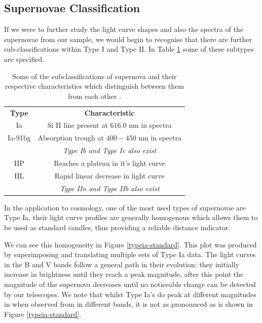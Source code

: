 \documentclass[twocolumn]{revtex4}
\newcommand{\squeezeup}{\vspace{-2.5mm}}
\begin{document}
\vspace{-3ex}
\subsection{Supernovae Classification}
\vspace{-2ex}

If we were to further study the light curve shapes and also the spectra of the supernovae from our sample, we would begin to recognise that there are further sub-classifications within Type I and Type II. In Table \ref{sn_classes} some of these subtypes are specified.

\begin{table}[h!]
\centering
\begin{tabular}{c@{\hskip 20pt}c} 
 \hline
 \textbf{Type} & \textbf{Characteristic} \\ 
 Ia		& Si II line present at $616.0$ nm in spectra \\
 Ia-91bg	& Absorption trough at $400-450$ nm in spectra \\
 		& \em Type Ib and Type Ic also exist \em \\
 IIP 		& Reaches a plateau in it's light curve  \\
 IIL		& Rapid linear decrease in light curve \\
 		& \em Type IIn and Type IIb also exist \em \\
 \hline
\end{tabular}
\caption{Some of the subclassifications of supernova and their respective characteristics which distinguish between them from each other \cite{longair, obs_phys_class_sn}.}
\label{sn_classes}
\end{table}
\squeezeup

In the application to cosmology, one of the most used types of supernovae are Type Ia, their light curve profiles are generally homogenous which allows them to be used as standard candles, thus providing a reliable distance indicator.  

We can see this homogeneity in Figure \ref{typeia-standard}. This plot was produced by superimposing and translating multiple sets of Type Ia data. The light curves in the B and V bands follow a general path in their evolution: they initially increase in brightness until they reach a peak magnitude, after this point the magnitude of the supernova decreases until no noticeable change can be detected by our telescopes. We note that whilst Type Ia's do peak at different magnitudes in when observed from in different bands, it is not as pronounced as is shown in Figure \ref{typeia-standard}.
\end{document}
